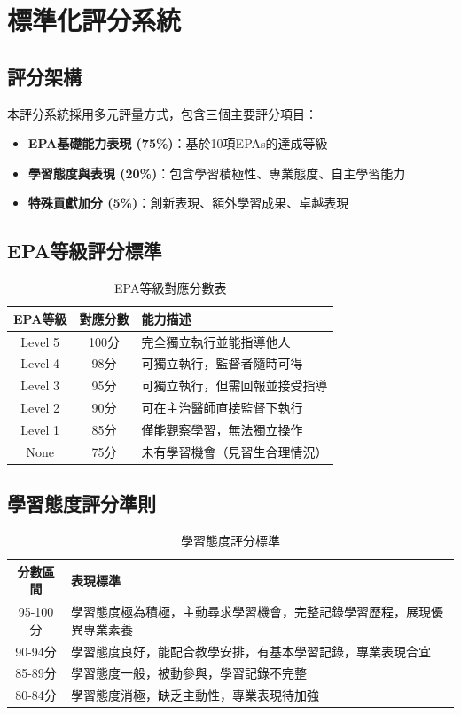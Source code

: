 \documentclass[12pt,a4paper]{article}
\begin{document}
\section{標準化評分系統}

\subsection{評分架構}

本評分系統採用多元評量方式，包含三個主要評分項目：
\begin{itemize}
\item \textbf{EPA基礎能力表現 (75\%)}：基於10項EPAs的達成等級
\item \textbf{學習態度與表現 (20\%)}：包含學習積極性、專業態度、自主學習能力
\item \textbf{特殊貢獻加分 (5\%)}：創新表現、額外學習成果、卓越表現
\end{itemize}

\subsection{EPA等級評分標準}

\begin{table}[h]
\centering
\caption{EPA等級對應分數表}
\begin{tabular}{|c|c|p{8cm}|}
\hline
\textbf{EPA等級} & \textbf{對應分數} & \textbf{能力描述} \\
\hline
Level 5 & 100分 & 完全獨立執行並能指導他人 \\
\hline
Level 4 & 98分 & 可獨立執行，監督者隨時可得 \\
\hline
Level 3 & 95分 & 可獨立執行，但需回報並接受指導 \\
\hline
Level 2 & 90分 & 可在主治醫師直接監督下執行 \\
\hline
Level 1 & 85分 & 僅能觀察學習，無法獨立操作 \\
\hline
None & 75分 & 未有學習機會（見習生合理情況）\\
\hline
\end{tabular}
\end{table}

\subsection{學習態度評分準則}

\begin{table}[h]
\centering
\caption{學習態度評分標準}
\begin{tabular}{|c|p{10cm}|}
\hline
\textbf{分數區間} & \textbf{表現標準} \\
\hline
95-100分 & 學習態度極為積極，主動尋求學習機會，完整記錄學習歷程，展現優異專業素養 \\
\hline
90-94分 & 學習態度良好，能配合教學安排，有基本學習記錄，專業表現合宜 \\
\hline
85-89分 & 學習態度一般，被動參與，學習記錄不完整 \\
\hline
80-84分 & 學習態度消極，缺乏主動性，專業表現待加強 \\
\hline
\end{tabular}
\end{table}
\end{document}
